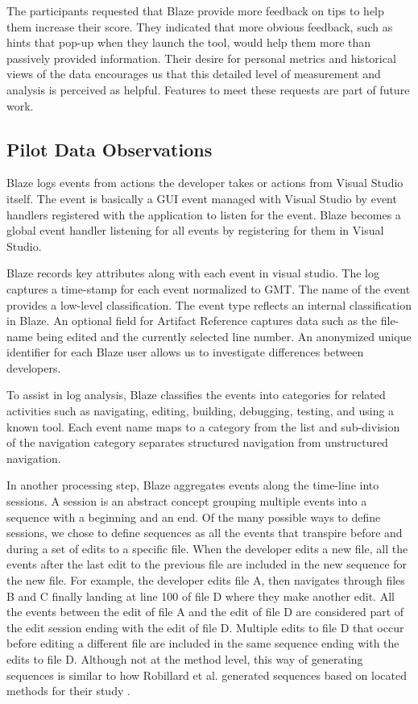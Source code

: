 \documentclass{sig-alternate}
\begin{document}
The participants requested that Blaze provide more feedback on tips to help them increase their score. They indicated that more obvious feedback, such as hints that pop-up when they launch the tool, would help them more than passively provided information.  Their desire for personal metrics and historical views of the data encourages us that this detailed level of measurement and analysis is perceived as helpful.  Features to meet these requests are part of future work.    

\subsection{Pilot Data Observations}

Blaze logs events from actions the developer takes or actions from Visual Studio itself.  The event is basically a GUI event managed with Visual Studio by event handlers registered with the application to listen for the event.  Blaze becomes a global event handler listening for all events by registering for them in Visual Studio.  

Blaze records key attributes along with each event in visual studio.  The log captures a time-stamp for each event normalized to GMT.  The name of the event provides a low-level classification.  The event type reflects an internal classification in Blaze.  An optional field for Artifact Reference captures data such as the file-name being edited and the currently selected line number.  An anonymized unique identifier for each Blaze user allows us to investigate differences between developers.

To assist in log analysis, Blaze classifies the events into categories for related activities such as navigating, editing, building, debugging,  testing, and using a  known tool.  Each event name maps to a category from the list and sub-division of the navigation category separates structured navigation from unstructured navigation.

In another processing step, Blaze aggregates events along the time-line into sessions.  A session is an abstract concept grouping multiple events into a sequence with a beginning and an end.  Of the many possible ways to define sessions, we chose to define sequences as all the events that transpire before and during a set of edits to a specific file.  When the developer edits a new file, all the events after the last edit to the previous file are included in the new sequence for the new file.  For example, the developer edits file A, then navigates through files B and C finally landing at line 100 of file D where they make another edit.  All the events between the edit of file A and the edit of file D are considered part of the edit session ending with the edit of file D.  Multiple edits to file D that occur before editing a different file are included in the same sequence ending with the edits to file D.  Although not at the method level, this way of generating sequences is similar to how Robillard et al. generated sequences based on located methods for their study \cite{wbsnipes:Robillard2004How}.
\end{document}
